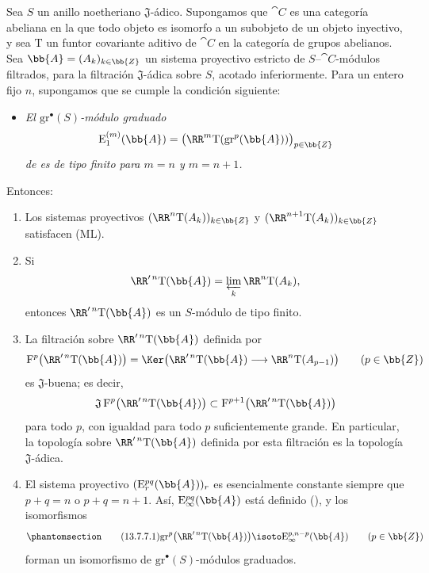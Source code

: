 \documentclass[oneside]{amsart}
\newcommand{\oldpage}[2][]{{\marginnote{\normalfont\textbf{#1}~|~#2}}\ignorespaces}
\let\EGAOriginalLabel\label
\renewcommand{\label}[1]{\phantomsection\EGAOriginalLabel{#1}}
\begin{document}
\begin{proposition}[13.7.7]
\label{0.13.7.7}
Sea $S$ un anillo noetheriano $\mathfrak{J}$-ádico.
Supongamos que $\cat{C}$ es una categoría abeliana en la que todo objeto
es isomorfo a un subobjeto de un objeto inyectivo, y sea
$\mathrm{T}$ un funtor covariante aditivo de $\cat{C}$ en la
categoría de grupos abelianos.
Sea $\bb{A}=(A_k)_{k\in\bb{Z}}$ un
\oldpage[0\textsubscript{III}]{78}
sistema proyectivo estricto de $S$--$\cat{C}$-módulos filtrados, para la
filtración $\mathfrak{J}$-ádica sobre $S$, acotado inferiormente.
Para un entero fijo $n$, supongamos que se cumple la condición siguiente:
\begin{itemize}
  \item[$(\mathrm{F}_n)$]
  \emph{El $\mathrm{gr}^\bullet(S)$-módulo graduado}
  \[
    \mathrm{E}_1^{(m)}(\bb{A})
    =
    \bigl(
      \RR^m\mathrm{T}(\mathrm{gr}^p(\bb{A}))
    \bigr)_{p\in\bb{Z}}
  \]
  \emph{de  es de tipo finito para
  $m=n$ y $m=n+1$.}
\end{itemize}
Entonces:
\begin{enumerate}
  \item[{\rm(i)}] Los sistemas proyectivos
  $(\RR^n\mathrm{T}(A_k))_{k\in\bb{Z}}$ y
  $(\RR^{n+1}\mathrm{T}(A_k))_{k\in\bb{Z}}$ satisfacen {\rm(ML)}.
  \item[{\rm(ii)}] Si
  \[
    \RR'^{\,n}\mathrm{T}(\bb{A})
    =
    \varprojlim_k\RR^n\mathrm{T}(A_k),
  \]
  entonces $\RR'^{\,n}\mathrm{T}(\bb{A})$ es un $S$-módulo de tipo
  finito.
  \item[{\rm(iii)}] La filtración sobre
  $\RR'^{\,n}\mathrm{T}(\bb{A})$ definida por
  \[
    \mathrm{F}^p\bigl(\RR'^{\,n}\mathrm{T}(\bb{A})\bigr)
    =
    \Ker\bigl(
      \RR'^{\,n}\mathrm{T}(\bb{A})
      \longrightarrow
      \RR^n\mathrm{T}(A_{p-1})
    \bigr)
    \qquad(p\in\bb{Z})
  \]
  es $\mathfrak{J}$-buena; es decir,
  \[
    \mathfrak{J}\,
    \mathrm{F}^p\bigl(\RR'^{\,n}\mathrm{T}(\bb{A})\bigr)
    \subset
    \mathrm{F}^{p+1}\bigl(\RR'^{\,n}\mathrm{T}(\bb{A})\bigr)
  \]
  para todo $p$, con igualdad para todo $p$ suficientemente grande.
  En particular, la topología sobre
  $\RR'^{\,n}\mathrm{T}(\bb{A})$ definida por esta filtración es la
  topología $\mathfrak{J}$-ádica.
  \item[{\rm(iv)}] El sistema proyectivo
  $(\mathrm{E}_r^{pq}(\bb{A}))_r$ es esencialmente constante siempre que
  $p+q=n$ o $p+q=n+1$.
  Así, $\mathrm{E}_\infty^{pq}(\bb{A})$ está definido
  \textup{()}, y los isomorfismos
  \begin{equation}
  \label{0.13.7.7.1}
  \tag{13.7.7.1}
    \mathrm{gr}^p\bigl(\RR'^{\,n}\mathrm{T}(\bb{A})\bigr)
    \isoto
    \mathrm{E}_\infty^{p,n-p}(\bb{A})
    \qquad(p\in\bb{Z})
  \end{equation}
  forman un isomorfismo de
  $\mathrm{gr}^\bullet(S)$-módulos graduados.
\end{enumerate}
\end{proposition}
\end{document}
